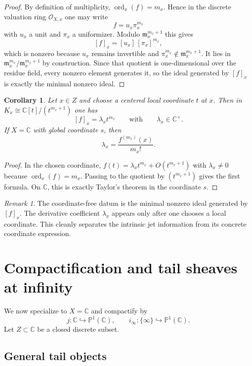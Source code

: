 \documentclass[11pt,a4paper]{article}
\newtheorem{corollary}[theorem]{Corollary}
\theoremstyle{definition}
\theoremstyle{remark}
\newtheorem{remark}[theorem]{Remark}
\DeclareMathOperator{\ord}{ord}
\newcommand{\CC}{\mathbb C}
\newcommand{\PP}{\mathbb P}
\newcommand{\cO}{\mathcal O}
\newcommand{\into}{\hookrightarrow}
\begin{document}
\begin{proof}
By definition of multiplicity, $\ord_x(f)=m_x$.  Hence in the discrete valuation ring $\cO_{X,x}$ one may write
\[
f=u_x\pi_x^{m_x}
\]
with $u_x$ a unit and $\pi_x$ a uniformizer.  Modulo $\mathfrak m_x^{m_x+1}$ this gives
\[
[f]_x=[u_x]\,[\pi_x]^{m_x},
\]
which is nonzero because $u_x$ remains invertible and $\pi_x^{m_x}\notin\mathfrak m_x^{m_x+1}$.  It lies in $\mathfrak m_x^{m_x}/\mathfrak m_x^{m_x+1}$ by construction.  Since that quotient is one-dimensional over the residue field, every nonzero element generates it, so the ideal generated by $[f]_x$ is exactly the minimal nonzero ideal.
\end{proof}

\begin{corollary}\label{cor:coordinate-derivative}
Let $x\in Z$ and choose a centered local coordinate $t$ at $x$.  Then in $K_x\cong \CC[t]/(t^{m_x+1})$ one has
\[
[f]_x=\lambda_x t^{m_x}
\qquad\text{with}\qquad
\lambda_x\in\CC^\times.
\]
If $X=\CC$ with global coordinate $s$, then
\[
\lambda_x=\frac{f^{(m_x)}(x)}{m_x!}.
\]
\end{corollary}

\begin{proof}
In the chosen coordinate, $f(t)=\lambda_x t^{m_x}+O(t^{m_x+1})$ with $\lambda_x\neq0$ because $\ord_x(f)=m_x$.  Passing to the quotient by $(t^{m_x+1})$ gives the first formula.  On $\CC$, this is exactly Taylor's theorem in the coordinate $s$.
\end{proof}

\begin{remark}
The coordinate-free datum is the minimal nonzero ideal generated by $[f]_x$.  The derivative coefficient $\lambda_x$ appears only after one chooses a local coordinate.  This cleanly separates the intrinsic jet information from its concrete coordinate expression.
\end{remark}

\section{Compactification and tail sheaves at infinity}

We now specialize to $X=\CC$ and compactify by
\[
j:\CC\into\PP^1(\CC),\qquad i_\infty:\{\infty\}\into\PP^1(\CC).
\]
Let $Z\subset\CC$ be a closed discrete subset.

\subsection{General tail objects}
\end{document}
